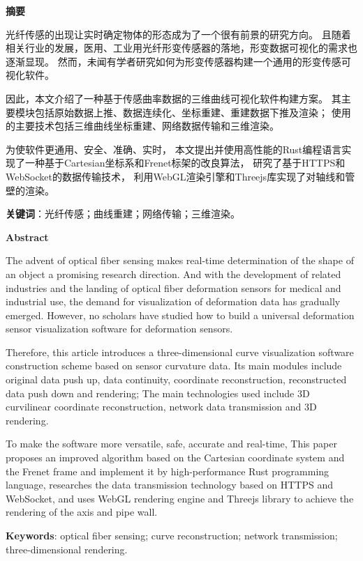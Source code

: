 \clearpage
\begin{center}
    \bfseries {} 摘要
\end{center}

光纤传感的出现让实时确定物体的形态成为了一个很有前景的研究方向。
且随着相关行业的发展，医用、工业用光纤形变传感器的落地，形变数据可视化的需求也逐渐显现。
然而，未闻有学者研究如何为形变传感器构建一个通用的形变传感可视化软件。

因此，本文介绍了一种基于传感曲率数据的三维曲线可视化软件构建方案。
其主要模块包括原始数据上推、数据连续化、坐标重建、重建数据下推及渲染；
使用的主要技术包括三维曲线坐标重建、网络数据传输和三维渲染。

为使软件更通用、安全、准确、实时，
本文提出并使用高性能的Rust编程语言实现了一种基于Cartesian坐标系和Frenet标架的改良算法，
研究了基于HTTPS和WebSocket的数据传输技术，
利用WebGL渲染引擎和Threejs库实现了对轴线和管壁的渲染。

\textbf{关键词}：光纤传感；曲线重建；网络传输；三维渲染。

\clearpage

\begin{center}
    \bfseries {} Abstract
\end{center}

The advent of optical fiber sensing makes real-time determination of the shape of an object a promising research direction.
And with the development of related industries and the landing of optical fiber deformation sensors for medical and industrial use, the demand for visualization of deformation data has gradually emerged.
However, no scholars have studied how to build a universal deformation sensor visualization software for deformation sensors.

Therefore, this article introduces a three-dimensional curve visualization software construction scheme based on sensor curvature data.
Its main modules include original data push up, data continuity, coordinate reconstruction, reconstructed data push down and rendering;
The main technologies used include 3D curvilinear coordinate reconstruction, network data transmission and 3D rendering.

To make the software more versatile, safe, accurate and real-time,
This paper proposes an improved algorithm based on the Cartesian coordinate system and the Frenet frame and implement it by high-performance Rust programming language,
researches the data transmission technology based on HTTPS and WebSocket,
and uses WebGL rendering engine and Threejs library to achieve the rendering of the axis and pipe wall.

\textbf{Keywords}: optical fiber sensing; curve reconstruction; network transmission; three-dimensional rendering.